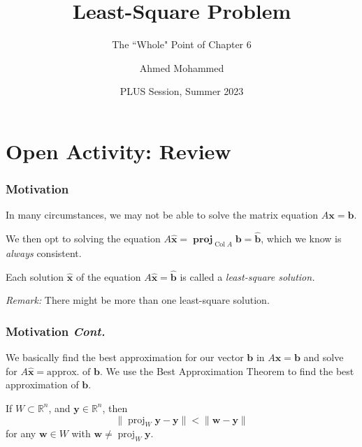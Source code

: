 \documentclass{beamer}
\title{Least-Square Problem}
\subtitle{The ``Whole"  Point of Chapter 6}
\author{Ahmed Mohammed}
\institute{Georgia Institute of Technology}
\date{PLUS Session, Summer 2023}
\renewcommand{\vec}[1]{\mathbf{#1}}
\DeclareMathOperator{\proj}{proj}
\DeclareMathOperator{\colspace}{Col}
\begin{document}
	\begin{frame}
		\maketitle
	\end{frame}

	\section{Open Activity: Review}
	\begin{frame}
		\frametitle{Motivation}
		In many circumstances, we may not be able to solve the matrix equation \(A\vec{x} = \vec{b}\). \pause

		We then opt to solving the equation \(A\vec{\hat{x}} = \vec{\proj}_{\colspace A} \vec{b} = \vec{\hat{b}}\), which we know is \emph{always} consistent. \pause

		\begin{definition}
			Each solution \(\vec{\hat{x}}\) of the equation \(A\vec{\hat{x}} = \vec{\hat{b}}\) is called a \emph{least-square solution.} \pause
		\end{definition}
			
		\textit{Remark:} There might be more than one least-square solution.
	\end{frame}

	\begin{frame}
		\frametitle{Motivation \textit{Cont.}}
		We basically find the best approximation for our vector \(\vec{b}\) in \(A\vec{x} = \vec{b}\) and solve for \(A\vec{\hat{x}} = \text{approx. of } \vec{b}\). We use the Best Approximation Theorem to find the best approximation of \(\vec{b}\).
		\begin{theorem}
			If \(W \subset \mathbb{R}^{n}\), and \(\vec{y} \in \mathbb{R}^n\), then 
			\[\|\operatorname{proj}_W\vec{y} - \vec{y} \| < \|\vec{w} - \vec{y}\|\]
			for any \(\vec{w} \in W\) with \(\vec{w} \ne \operatorname{proj}_W\vec{y}.\)
		\end{theorem}
	\end{frame}
\end{document}
